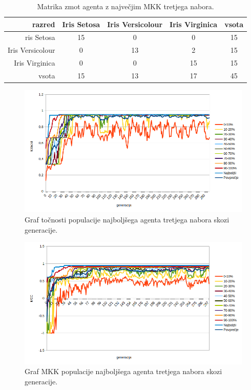 \begin{table}[H]
    \centering
    \begin{tabular}{||rcccc||}
        \hline
        razred           & Iris Setosa & Iris Versicolour & Iris Virginica & vsota \\ \hline
        ris Setosa       & 15          & 0                & 0              & 15    \\ \hline
        Iris Versicolour & 0           & 13               & 2              & 15    \\ \hline
        Iris Virginica   & 0           & 0                & 15             & 15    \\ \hline
        vsota            & 15          & 13               & 17             & 45    \\ \hline
    \end{tabular}
    \caption{Matrika zmot agenta z največjim MKK tretjega nabora.}
    \label{tab:iris_mcc_3}
\end{table}

\begin{figure}[H]
    \begin{center}
        \includegraphics[width=13cm]{iris/3/acc}
    \end{center}
    \caption{Graf točnosti populacije najboljšega agenta tretjega nabora skozi generacije.}
    \label{fig:iris_acc_3}
\end{figure}

\begin{figure}[H]
    \begin{center}
        \includegraphics[width=13cm]{iris/3/mcc}
    \end{center}
    \caption{Graf MKK populacije najboljšega agenta tretjega nabora skozi generacije.}
    \label{fig:iris_mcc_3}
\end{figure}

